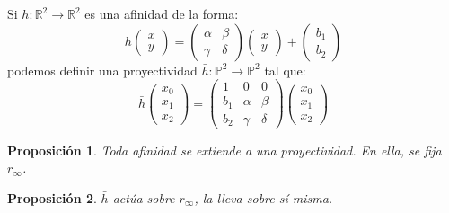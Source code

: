 \documentclass[11pt, a4paper]{article}
\newif\IfInSansMode
\newcommand{\R}{\mathbb{R}}
\theoremstyle{theorem-style}
\newtheorem{nprop}{Proposición}[section]
\theoremstyle{definition-style}
\theoremstyle{remark-style}
\theoremstyle{example-style}
\begin{document}
Si $h: \R^2 \to \R^2$ es una afinidad de la forma:
\[
h \begin{pmatrix}
x\\
y
\end{pmatrix}  = \begin{pmatrix}
 \alpha & \beta \\
 \gamma & \delta
\end{pmatrix} \begin{pmatrix}
x\\
y
\end{pmatrix} + \begin{pmatrix}
b_1\\
b_2
\end{pmatrix}
\]
podemos definir una proyectividad $\bar h : \mathbb P ^2 \to \mathbb P^2$ tal que:
\[
\bar{h} \begin{pmatrix}
 x_0\\
 x_1\\
 x_2
\end{pmatrix}  = \begin{pmatrix}
 1 & 0 & 0 \\
 b_1 & \alpha & \beta \\
 b_2 & \gamma & \delta
\end{pmatrix} \begin{pmatrix}
 x_0\\
 x_1\\
 x_2
\end{pmatrix} 
\]

\begin{nprop}
	Toda afinidad se extiende a una proyectividad. En ella, se fija $r_\infty$.
\end{nprop}

\begin{nprop}
	$\bar h$ actúa sobre $r_\infty$, la lleva sobre sí misma.
\end{nprop}
\end{document}
